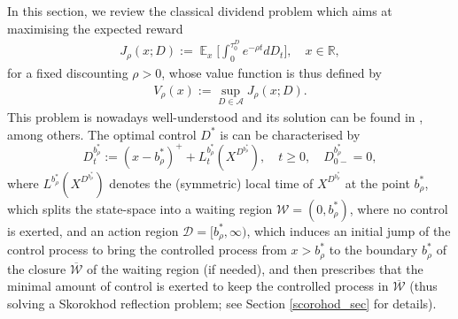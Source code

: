 \documentclass[11pt]{article} %
\def\R{\mathbb{R}}
\DeclareMathOperator{\E}{\mathbb E}
\numberwithin{komcounter}{section}
\numberwithin{equation}{section}
\numberwithin{theorem}{section}
\begin{document}
In this section, we review the classical dividend problem which aims at maximising the expected reward 
\begin{align} \label{reward_classical}
J_\rho(x;D) := \E_x\bigg[ \int_0^{\tau^D_0} e^{-\rho t} dD_t \bigg],
\quad x \in \R,
\end{align}
for a fixed discounting $\rho>0$, whose value function is thus defined by 
\begin{align}\label{classical_value}
V_\rho(x):=\sup_{D \in \mathcal{A}} J_\rho(x;D).
\end{align}
This problem is nowadays well-understood and its solution can be found in \cite{jeanblanc1995optimization,lokka2008optimal}, among others.
The optimal control $D^*$ is can be characterised by
\begin{equation} \label{SR}
D^{b^*_\rho}_t := (x-b^*_\rho)^+ + L^{b^*_\rho}_t(X^{D^{b^*_\rho}}), \quad t\geq 0, \quad D^{b^*_\rho}_{0-}=0 ,  
\end{equation}
where $L^{b^*_\rho}(X^{D^{b^*_\rho}})$ denotes the (symmetric) local time of $X^{D^{b^*_\rho}}$ at the point $b^*_\rho$,
which splits the state-space into a waiting region $\mathcal{W} = (0,b^*_\rho)$, where no control is exerted, and an action region $\mathcal{D} = [b^*_\rho, \infty)$,
which induces an initial jump of the control process to bring the controlled process from $x > b^*_\rho$ to the boundary $b^*_\rho$ of the closure $\overline{\mathcal{W}}$ of the waiting region (if needed), 
and then prescribes that the minimal amount of control is exerted to keep the controlled process in $\overline{\mathcal{W}}$ (thus solving a Skorokhod reflection problem; see Section \ref{scorohod_sec} for details).    
\end{document}
